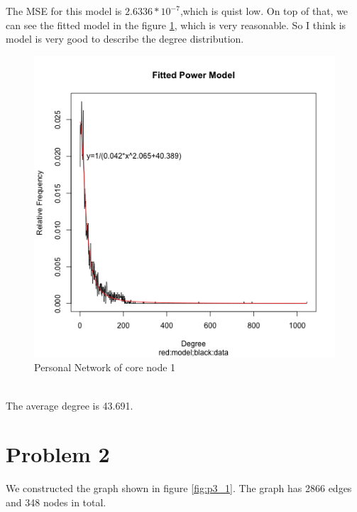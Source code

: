 \documentclass{article}
\begin{document}
The MSE for this model is $2.6336*10^{-7}$,which is quist low. On top of that, we can see the fitted model in the figure \ref{fig:p1_2}, which is very reasonable. So I think is model is very good to describe the degree distribution.\\
\begin{figure}[htbp]
\centering
\includegraphics[width=.8\textwidth]{1_2.png}
\caption{Personal Network of core node 1}
\label{fig:p1_2}
\end{figure}\\
The average degree is 43.691.
\section{Problem 2}
We constructed the graph shown in figure \ref{fig:p3_1}. The graph has 2866 edges and 348 nodes in total.
\end{document}
